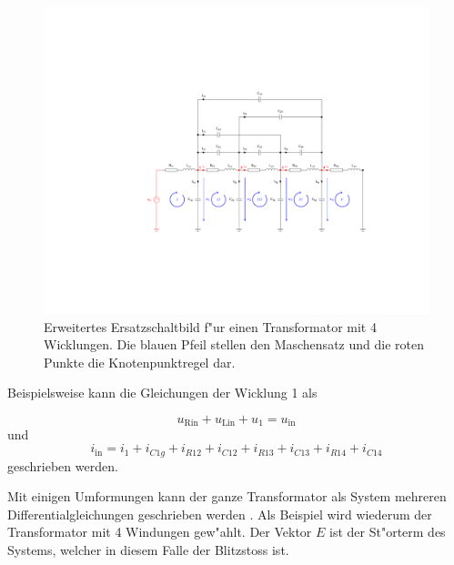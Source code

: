 \begin{refsection}
\begin{figure}
	\centering
	\includegraphics[width=\hsize]{./trafo/images/orig_trafo.pdf}
	\caption[Erweitertes Ersatzschaltbild f"ur einen Transformator mit Maschensatz und Knotenpunkt]{Erweitertes Ersatzschaltbild f"ur einen Transformator mit 4 Wicklungen. Die blauen Pfeil stellen den Maschensatz und die roten Punkte die Knotenpunktregel dar.}
	\label{trafo:orig}
\end{figure}

Beispielsweise kann die Gleichungen der Wicklung 1 als 

\begin{equation*}
	u_\mathrm{Rin} + u_\mathrm{Lin} + u_1 = u_\mathrm{in}
\end{equation*}
und 
\begin{equation}
	i_\mathrm{in} = i_1 + i_{C1g} + i_{R12} + i_{C12} + i_{R13} + i_{C13} + i_{R14} + i_{C14}
\end{equation}
geschrieben werden. 

Mit einigen Umformungen kann der ganze Transformator als System mehreren Differentialgleichungen geschrieben werden \cite{trafo:SeminarCHR}. Als Beispiel wird wiederum der Transformator mit 4 Windungen gew"ahlt. Der Vektor $E$ ist der St"orterm des Systems, welcher in diesem Falle der Blitzstoss ist.


\end{refsection}
